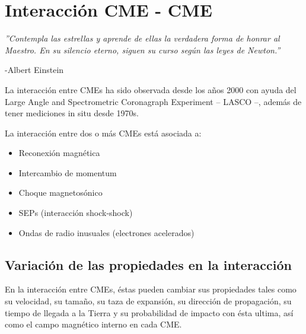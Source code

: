 \chapter{Interacción \ac{CME} - CME}
\begin{flushright}
\item \textit{''Contempla las estrellas y aprende de ellas
la verdadera forma de honrar al Maestro.
En su silencio eterno, siguen su curso
según las leyes de Newton.''}

-Albert Einstein
\end{flushright}

La interacción entre \acp{CME} ha sido observada desde los años 2000 con ayuda del Large Angle and Spectrometric Coronagraph Experiment – LASCO –, además de tener mediciones in situ desde 1970s.



La interacción entre dos o más \acp{CME} está asociada a:

\begin{itemize}
    \item Reconexión magnética
\item Intercambio de momentum
\item Choque magnetosónico
\item SEPs (interacción shock-shock)
\item Ondas de radio inusuales (electrones acelerados)
\end{itemize}

\section{Variación de las propiedades en la interacción}
En la interacción entre CMEs, éstas pueden cambiar sus propiedades tales como su velocidad, su tamaño, su taza de expansión, su dirección de propagación, su tiempo de llegada a la Tierra y su probabilidad de impacto con ésta ultima, así como el campo magnético interno en cada CME.

